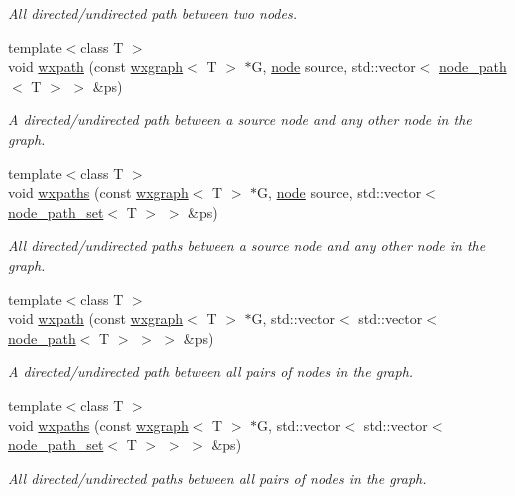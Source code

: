 \begin{DoxyCompactItemize}
\begin{DoxyCompactList}\small\item\em All directed/undirected path between two nodes. \end{DoxyCompactList}\item 
{\footnotesize template$<$class T $>$ }\\void \hyperlink{namespacelgraph_1_1traversal_ae10a39ab07f1f914d64498729bbad09d}{wxpath} (const \hyperlink{classlgraph_1_1wxgraph}{wxgraph}$<$ T $>$ $\ast$G, \hyperlink{namespacelgraph_a397169dd66adf725210a30fb7251773e}{node} source, std\+::vector$<$ \hyperlink{classlgraph_1_1node__path}{node\+\_\+path}$<$ T $>$ $>$ \&ps)
\begin{DoxyCompactList}\small\item\em A directed/undirected path between a source node and any other node in the graph. \end{DoxyCompactList}\item 
{\footnotesize template$<$class T $>$ }\\void \hyperlink{namespacelgraph_1_1traversal_a2288b1d8a900fd71302816bc0f6a7d01}{wxpaths} (const \hyperlink{classlgraph_1_1wxgraph}{wxgraph}$<$ T $>$ $\ast$G, \hyperlink{namespacelgraph_a397169dd66adf725210a30fb7251773e}{node} source, std\+::vector$<$ \hyperlink{namespacelgraph_a0570ce57129123d5816913d287f6cc73}{node\+\_\+path\+\_\+set}$<$ T $>$ $>$ \&ps)
\begin{DoxyCompactList}\small\item\em All directed/undirected paths between a source node and any other node in the graph. \end{DoxyCompactList}\item 
{\footnotesize template$<$class T $>$ }\\void \hyperlink{namespacelgraph_1_1traversal_a4df6479cb82c8039a26f5ea6f7a7d492}{wxpath} (const \hyperlink{classlgraph_1_1wxgraph}{wxgraph}$<$ T $>$ $\ast$G, std\+::vector$<$ std\+::vector$<$ \hyperlink{classlgraph_1_1node__path}{node\+\_\+path}$<$ T $>$ $>$ $>$ \&ps)
\begin{DoxyCompactList}\small\item\em A directed/undirected path between all pairs of nodes in the graph. \end{DoxyCompactList}\item 
{\footnotesize template$<$class T $>$ }\\void \hyperlink{namespacelgraph_1_1traversal_a5b6e18906e47ee3a820d1bf676e61156}{wxpaths} (const \hyperlink{classlgraph_1_1wxgraph}{wxgraph}$<$ T $>$ $\ast$G, std\+::vector$<$ std\+::vector$<$ \hyperlink{namespacelgraph_a0570ce57129123d5816913d287f6cc73}{node\+\_\+path\+\_\+set}$<$ T $>$ $>$ $>$ \&ps)
\begin{DoxyCompactList}\small\item\em All directed/undirected paths between all pairs of nodes in the graph. \end{DoxyCompactList}\end{DoxyCompactItemize}


